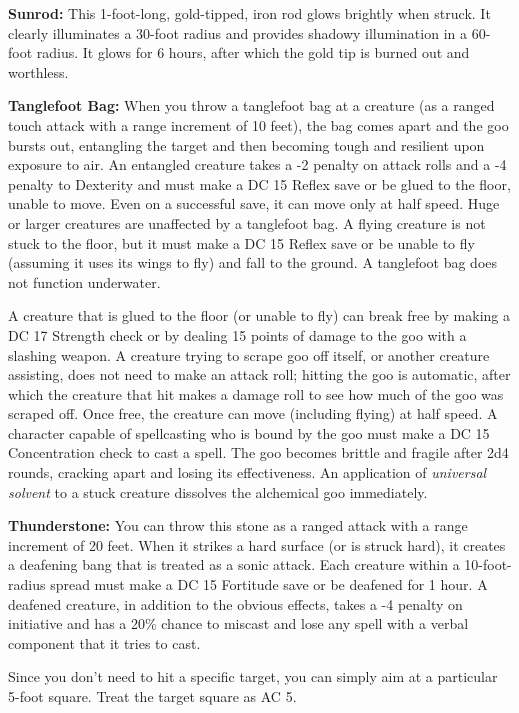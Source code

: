 \textbf{Sunrod:} This 1-foot-long, gold-tipped, iron rod glows brightly when struck. 
It clearly illuminates a 30-foot radius and provides shadowy illumination in a 
60-foot radius. It glows for 6 hours, after which the gold tip is burned out and 
worthless.

\textbf{Tanglefoot Bag:} When you throw a tanglefoot bag at a creature (as a ranged 
touch attack with a range increment of 10 feet), the bag comes apart and the goo 
bursts out, entangling the target and then becoming tough and resilient upon exposure 
to air. An entangled creature takes a -2 penalty on attack rolls and a -4 penalty 
to Dexterity and must make a DC 15 Reflex save or be glued to the floor, unable 
to move. Even on a successful save, it can move only at half speed. Huge or larger 
creatures are unaffected by a tanglefoot bag. A flying creature is not stuck to 
the floor, but it must make a DC 15 Reflex save or be unable to fly (assuming it 
uses its wings to fly) and fall to the ground. A tanglefoot bag does not function 
underwater.

A creature that is glued to the floor (or unable to fly) can break free by making 
a DC 17 Strength check or by dealing 15 points of damage to the goo with a slashing 
weapon. A creature trying to scrape goo off itself, or another creature assisting, 
does not need to make an attack roll; hitting the goo is automatic, after which 
the creature that hit makes a damage roll to see how much of the goo was scraped 
off. Once free, the creature can move (including flying) at half speed. A character 
capable of spellcasting who is bound by the goo must make a DC 15 Concentration 
check to cast a spell. The goo becomes brittle and fragile after 2d4 rounds, cracking 
apart and losing its effectiveness. An application of \textit{universal solvent} 
to a stuck creature dissolves the alchemical goo immediately.

\textbf{Thunderstone:} You can throw this stone as a ranged attack with a range 
increment of 20 feet. When it strikes a hard surface (or is struck hard), it creates 
a deafening bang that is treated as a sonic attack. Each creature within a 10-foot-radius 
spread must make a DC 15 Fortitude save or be deafened for 1 hour. A deafened creature, 
in addition to the obvious effects, takes a -4 penalty on initiative and has a 
20\% chance to miscast and lose any spell with a verbal component that it tries 
to cast.

Since you don't need to hit a specific target, you can simply aim at a particular 
5-foot square. Treat the target square as AC 5.

